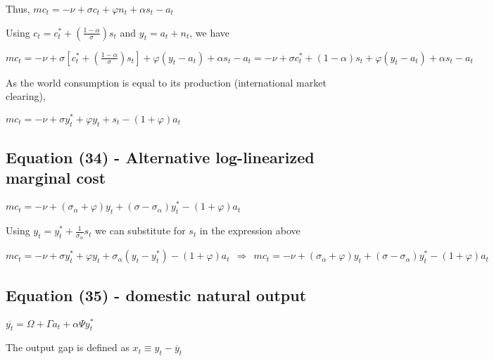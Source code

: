 \documentclass[
]{article}
\begin{document}
Thus, \(mc_t= -\nu + \sigma c_t + \varphi n_t + \alpha s_t -a_t\)

Using
\(\displaystyle c_t=c_t^*+ \left( \frac{1-\alpha}{\sigma} \right)s_t\)
and \(y_t = a_t + n_t\), we have

\(\displaystyle mc_t= -\nu + \sigma \left[ c_t^*+ \left( \frac{1-\alpha}{\sigma} \right)s_t \right] + \varphi (y_t-a_t) + \alpha s_t -a_t=-\nu + \sigma c_t^*+ ( 1-\alpha )s_t + \varphi (y_t-a_t) + \alpha s_t -a_t\)

As the world consumption is equal to its production (international
market clearing),

\(\displaystyle mc_t =-\nu + \sigma y_t^*+ \varphi y_t+ s_t -(1+\varphi)a_t\)

\vspace{12pt}

\hypertarget{equation-34---alternative-log-linearized-marginal-cost}{%
\subsection{Equation (34) - Alternative log-linearized marginal
cost}\label{equation-34---alternative-log-linearized-marginal-cost}}

\(mc_t = -\nu + (\sigma_\alpha+\varphi)y_t + (\sigma-\sigma_\alpha)y_t^*-(1+\varphi)a_t\)

\vspace{18pt}

Using \(\displaystyle y_t = y_t^* + \frac{1}{\sigma_\alpha}s_t\) we can
substitute for \(s_t\) in the expression above

\(\displaystyle mc_t =-\nu + \sigma y_t^*+ \varphi y_t+ \sigma_\alpha(y_t-y_t^*) -(1+\varphi)a_t \ \ \Rightarrow \ \ mc_t = -\nu + (\sigma_\alpha+\varphi)y_t + (\sigma-\sigma_\alpha)y_t^*-(1+\varphi)a_t\)

\vspace{12pt}

\hypertarget{equation-35---domestic-natural-output}{%
\subsection{Equation (35) - domestic natural
output}\label{equation-35---domestic-natural-output}}

\(\overline{y_t} =\Omega+\Gamma a_t+ \alpha \Psi y_t^*\)

\vspace{8pt}

The output gap is defined as \(x_t \equiv y_t - \overline{y}_t\)
\end{document}
